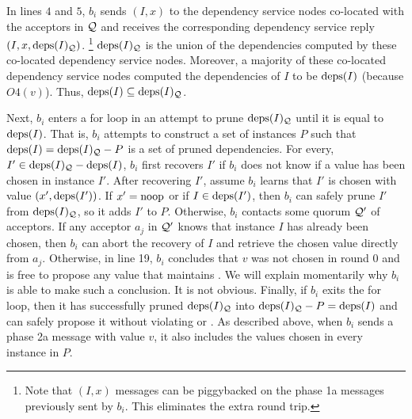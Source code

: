 In lines $4$ and $5$, $b_i$ sends $(I, x)$ to the dependency service nodes
co-located with the acceptors in $\mathcal{Q}$ and receives the corresponding
dependency service reply $(I, x, \text{deps}(I)_{\mathcal{Q}})$.%
\footnote{%
  Note that $(I, x)$ messages can be piggybacked on the phase 1a messages
  previously sent by $b_i$. This eliminates the extra round trip.
}
$\text{deps}(I)_{\mathcal{Q}}$ is the union of the dependencies computed by these
co-located dependency service nodes. Moreover, a majority of these co-located
dependency service nodes computed the dependencies of $I$ to be $\text{deps}(I)$
(because $O4(v)$). Thus, $\text{deps}(I) \subseteq \text{deps}(I)_{\mathcal{Q}}$.

Next, $b_i$ enters a for loop in an attempt to prune $\text{deps}(I)_{\mathcal{Q}}$ until
it is equal to $\text{deps}(I)$. That is, $b_i$ attempts to construct a set of
instances $P$ such that $\text{deps}(I) = \text{deps}(I)_{\mathcal{Q}} - P$ is a set of pruned
dependencies. For every, $I' \in \text{deps}(I)_{\mathcal{Q}} - \text{deps}(I)$, $b_i$ first
recovers $I'$ if $b_i$ does not know if a value has been chosen in instance
$I'$. After recovering $I'$, assume $b_i$ learns that $I'$ is chosen with value
$(x', \text{deps}(I'))$. If $x' = \text{noop}$ or if $I \in \text{deps}(I')$, then $b_i$ can
safely prune $I'$ from $\text{deps}(I)_{\mathcal{Q}}$, so it adds $I'$ to $P$.
%
Otherwise, $b_i$ contacts some quorum $\mathcal{Q}'$ of acceptors. If any acceptor
$a_j$ in $\mathcal{Q}'$ knows that instance $I$ has already been chosen, then $b_i$
can abort the recovery of $I$ and retrieve the chosen value directly from
$a_j$. Otherwise, in line 19, $b_i$ concludes that $v$ was not chosen in round
$0$ and is free to propose any value that maintains
. We will explain momentarily why $b_i$ is able to
make such a conclusion. It is not obvious.
%
Finally, if $b_i$ exits the for loop, then it has successfully pruned
$\text{deps}(I)_{\mathcal{Q}}$ into $\text{deps}(I)_{\mathcal{Q}} - P = \text{deps}(I)$ and can safely
propose it without violating  or
. As described above, when $b_i$ sends a phase 2a
message with value $v$, it also includes the values chosen in every instance in
$P$.

